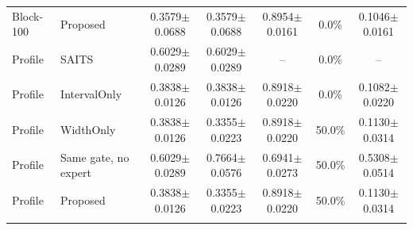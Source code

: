 \begin{table}
\begin{tabular*}{\textwidth}{@{\extracolsep{\fill}}llccccc@{}}
Block-100 & Proposed & 0.3579$\pm$0.0688 & 0.3579$\pm$0.0688 & 0.8954$\pm$0.0161 & 0.0\% & 0.1046$\pm$0.0161 \\
\addlinespace[1.5pt]
Profile & SAITS & 0.6029$\pm$0.0289 & 0.6029$\pm$0.0289 & -- & 0.0\% & -- \\
Profile & IntervalOnly & 0.3838$\pm$0.0126 & 0.3838$\pm$0.0126 & 0.8918$\pm$0.0220 & 0.0\% & 0.1082$\pm$0.0220 \\
Profile & WidthOnly & 0.3838$\pm$0.0126 & 0.3355$\pm$0.0223 & 0.8918$\pm$0.0220 & 50.0\% & 0.1130$\pm$0.0314 \\
Profile & Same gate, no expert & 0.6029$\pm$0.0289 & 0.7664$\pm$0.0576 & 0.6941$\pm$0.0273 & 50.0\% & 0.5308$\pm$0.0514 \\
Profile & Proposed & 0.3838$\pm$0.0126 & 0.3355$\pm$0.0223 & 0.8918$\pm$0.0220 & 50.0\% & 0.1130$\pm$0.0314 \\
\addlinespace[1.5pt]
\bottomrule
\end{tabular*}
\end{table}


